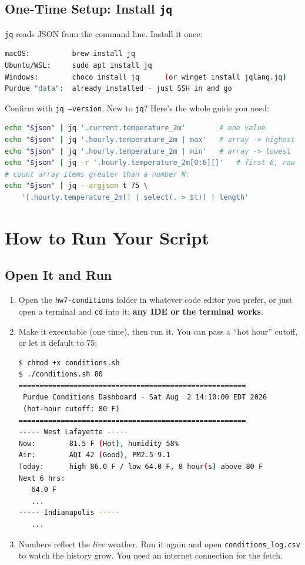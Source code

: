 \documentclass[11pt]{article}
\begin{document}
\subsection{One-Time Setup: Install \texttt{jq}}
\texttt{jq} reads JSON from the command line. Install it once:
\begin{lstlisting}[language=bash]
macOS:          brew install jq
Ubuntu/WSL:     sudo apt install jq
Windows:        choco install jq      (or winget install jqlang.jq)
Purdue "data":  already installed - just SSH in and go
\end{lstlisting}
Confirm with \texttt{jq --version}. New to \texttt{jq}? Here's the whole guide you need:
\begin{lstlisting}[language=bash]
echo "$json" | jq '.current.temperature_2m'        # one value
echo "$json" | jq '.hourly.temperature_2m | max'   # array -> highest
echo "$json" | jq '.hourly.temperature_2m | min'   # array -> lowest
echo "$json" | jq -r '.hourly.temperature_2m[0:6][]'   # first 6, raw
# count array items greater than a number N:
echo "$json" | jq --argjson t 75 \
    '[.hourly.temperature_2m[] | select(. > $t)] | length'
\end{lstlisting}

\section{How to Run Your Script}
\subsection{Open It and Run}
\begin{enumerate}
    \item Open the \texttt{hw7-conditions} folder in whatever code editor you prefer, or just open a terminal and \texttt{cd} into it; \textbf{any IDE or the terminal works}.
    \item Make it executable (one time), then run it. You can pass a ``hot hour'' cutoff, or let it default to 75:
\begin{lstlisting}[language=bash]
$ chmod +x conditions.sh
$ ./conditions.sh 80
======================================================
 Purdue Conditions Dashboard - Sat Aug  2 14:10:00 EDT 2026
 (hot-hour cutoff: 80 F)
======================================================
----- West Lafayette -----
Now:        81.5 F (Hot), humidity 58%
Air:        AQI 42 (Good), PM2.5 9.1
Today:      high 86.0 F / low 64.0 F, 8 hour(s) above 80 F
Next 6 hrs:
   64.0 F
   ...
----- Indianapolis -----
   ...
\end{lstlisting}
    \item Numbers reflect the \textit{live} weather. Run it again and open \texttt{conditions\_log.csv} to watch the history grow. You need an internet connection for the fetch.
\end{enumerate}
\end{document}

